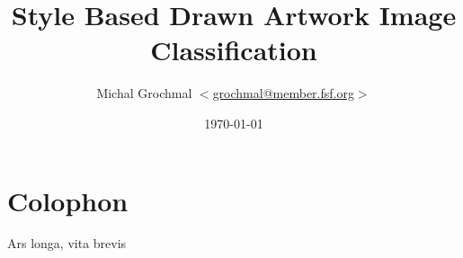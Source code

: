 \documentclass[a4paper,twocolumn]{article}
\title{Style Based Drawn Artwork Image Classification}
\author{Michal Grochmal
  $<$\href{mailto:grochmal@member.fsf.org}{grochmal@member.fsf.org}$>$
}
\date{\today}
\begin{document}
\maketitle

\section{Colophon}

Ars longa, vita brevis \cite{oliphant06numpy}



\end{document}
